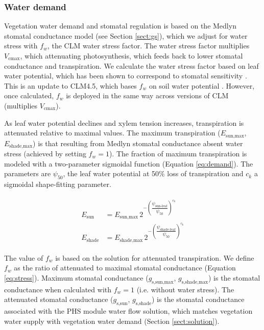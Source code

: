 \documentclass[draft,linenumbers]{agujournal}
\begin{document}
    \subsubsection{Water demand}
    \label{sect:demand}
    
    Vegetation water demand and stomatal regulation is based on the Medlyn stomatal conductance model (see Section \ref{sect:gs}), 
    which we adjust for water stress with $f_w$, the CLM water stress factor. 
    The water stress factor multiplies $V_{\text{cmax}}$, which attenuating photosynthesis, which feeds back to lower stomatal conductance and transpiration.
    We calculate the water stress factor based on leaf water potential, which has been shown to correspond to stomatal sensitivity \citep{klein2014}.
    This is an update to CLM4.5, which bases $f_w$ on soil water potential \citep{oleson2013}.
    However, once calculated, $f_w$ is deployed in the same way across versions of CLM (multiplies $V_{\text{cmax}}$).

     As leaf water potential declines and xylem tension increases, transpiration is attenuated relative to maximal values.
     The maximum transpiration ($E_{\text{sun,max}}$, $E_{\text{shade,max}}$) is that resulting from Medlyn stomatal conductance absent water stress (achieved by setting $f_w=1$).
     The fraction of maximum transpiration is modeled with a two-parameter sigmoidal function (Equation \ref{eq:demand}). 
     The parameters are $\psi_{50}$, the leaf water potential at 50\% loss of transpiration and 
     $c_k$ a sigmoidal shape-fitting parameter.

     \begin{linenomath*}
     \begin{eqnarray}
     \begin{aligned}
     \label{eq:demand}
     E_{\text{sun}}     &= E_{\text{sun,max}} \, 2^{-\left(\dfrac{\psi_{\text{sun-leaf}}}{\psi_{50}}\right)^{c_k}} \\
     E_{\text{shade}} &= E_{\text{shade,max}} \, 2^{-\left(\dfrac{\psi_{\text{shade-leaf}}}{\psi_{50}}\right)^{c_k}}
     \end{aligned}
     \end{eqnarray}
     \end{linenomath*}
    
    The value of $f_w$ is based on the solution for attenuated transpiration.
    We define $f_w$ as the ratio of attenuated to maximal stomatal conductance (Equation \ref{eq:stress}).
    Maximum stomatal conductance ($g_{\text{s,sun,max}}$, $g_{\text{s,shade,max}}$) is the stomatal conductance when calculated with $f_w=1$
    (i.e. without water stress). 
    The attenuated stomatal conductance ($g_{\text{s,sun}}$, $g_{\text{s,shade}}$) is the stomatal conductance associated with the PHS module
    water flow solution, which matches vegetation water supply with vegetation water demand 
    (Section \ref{sect:solution}).
    
\end{document}

